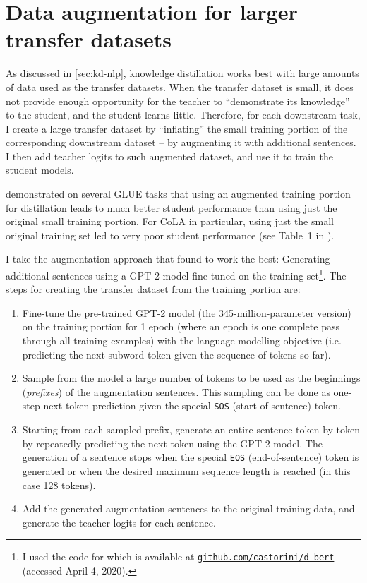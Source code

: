 \documentclass[bsc,frontabs,singlespacing,parskip,deptreport]{infthesis}
\newcommand\rurl[1]{%
  \href{https://#1}{\nolinkurl{#1}}%
}
\begin{document}
{  \section{Data augmentation for larger transfer datasets}{
    \label{sec:augmentation}
    As discussed in \autoref{sec:kd-nlp}, knowledge distillation works best with large amounts of data used as the transfer datasets. When the transfer dataset is small, it does not provide enough opportunity for the teacher to ``demonstrate its knowledge'' to the student, and the student learns little. Therefore, for each downstream task, I create a large transfer dataset by ``inflating'' the small training portion of the corresponding downstream dataset -- by augmenting it with additional sentences. I then add teacher logits to such augmented dataset, and use it to train the student models.

    \citet{Tang_2019b} demonstrated on several GLUE tasks that using an augmented training portion for distillation leads to much better student performance than using just the original small training portion.
    For CoLA in particular, using just the small original training set led to very poor student performance (see Table~1 in \citeauthor{Tang_2019b}).
    
    I take the augmentation approach that \citeauthor{Tang_2019b} found to work the best: Generating additional sentences using a GPT-2 model \citep{Radford_2019} fine-tuned on the training set\footnote{I used the code for \citet{Tang_2019b} which is available at \rurl{github.com/castorini/d-bert} (accessed April 4, 2020).}. The steps for creating the transfer dataset from the training portion are:
    \begin{enumerate}
      \item Fine-tune the pre-trained GPT-2 model (the 345-million-parameter version) on the training portion for 1 epoch (where an epoch is one complete pass through all training examples) with the language-modelling objective (i.e. predicting the next subword token given the sequence of tokens so far).
      \item Sample from the model a large number of tokens to be used as the beginnings (\textit{prefixes}) of the augmentation sentences. This sampling can be done as one-step next-token prediction given the special \verb|SOS| (start-of-sentence) token.
      \item Starting from each sampled prefix, generate an entire sentence token by token by repeatedly predicting the next token using the GPT-2 model. The generation of a sentence stops when the special \verb|EOS| (end-of-sentence) token is generated or when the desired maximum sequence length is reached (in this case 128 tokens).
      \item Add the generated augmentation sentences to the original training data, and generate the teacher logits for each sentence.
    \end{enumerate}

}}
\end{document}
